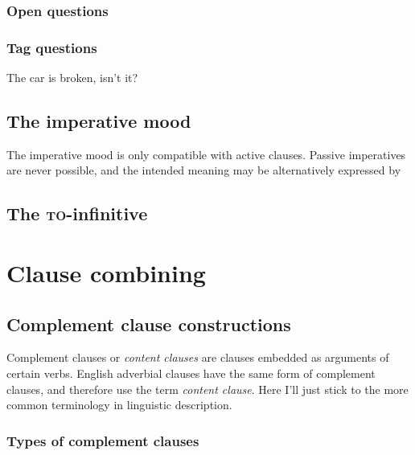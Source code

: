 \documentclass[UTF8, a4paper, oneside, scheme=plain]{ctexrep}
\newcommand*{\term}[1]{\emph{#1}}
\newcommand{\corpuscat}[1]{\textsc{#1}}
\begin{document}
\subsection{Open questions}

\subsection{Tag questions}

\begin{exe}
    \ex The car is broken, isn't it?
\end{exe}

\section{The imperative mood}

The imperative mood is only compatible with active clauses.
Passive imperatives are never possible, 
and the intended meaning may be alternatively expressed by 

\section{The \corpuscat{to}-infinitive}

\chapter{Clause combining}\label{chap:clause-combining}

\section{Complement clause constructions}\label{sec:clause-combining.complement-clause}

Complement clauses or \term{content clauses} \citep{cgel} are clauses embedded as arguments of certain verbs.
English adverbial clauses have the same form of complement clauses,
and therefore \citet{cgel} use the term \term{content clause}.
Here I'll just stick to the more common terminology in linguistic description.

\subsection{Types of complement clauses}
\end{document}
